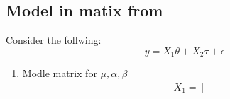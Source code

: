 \documentclass[10pt, oneside]{article}
\begin{document}
\subsection{Model in matix from}
Consider the follwing:
$$
	y = X_1\theta + X_2\tau + \epsilon
$$
\begin{enumerate}
	\item Modle matrix for $\mu, \alpha, \beta$
	      \[
		      \begin{split}
			      X_1 = []
		      \end{split}
	      \]
\end{enumerate}
\end{document}
